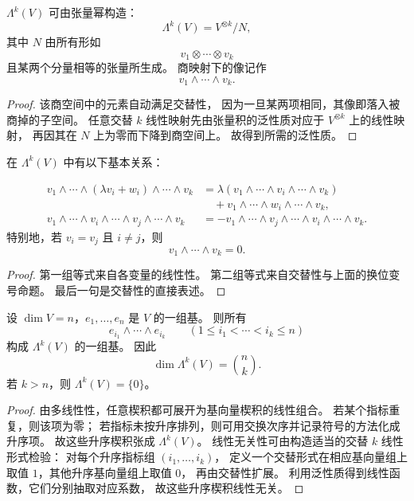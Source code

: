 \begin{theorem} $\Lambda^k(V)$ 可由张量幂构造： \[ \Lambda^k(V)=V^{\otimes k}/N, \] 其中 $N$ 由所有形如 \[ v_1\otimes\cdots\otimes v_k \] 且某两个分量相等的张量所生成。 商映射下的像记作 \[ v_1\wedge\cdots\wedge v_k. \] \end{theorem}




\begin{proof} 该商空间中的元素自动满足交替性， 因为一旦某两项相同，其像即落入被商掉的子空间。 任意交替 $k$ 线性映射先由张量积的泛性质对应于 $V^{\otimes k}$ 上的线性映射， 再因其在 $N$ 上为零而下降到商空间上。 故得到所需的泛性质。 \end{proof}




\begin{proposition} 在 $\Lambda^k(V)$ 中有以下基本关系：




\begin{align*} v_1\wedge\cdots\wedge(\lambda v_i+w_i)\wedge\cdots\wedge v_k &=\lambda(v_1\wedge\cdots\wedge v_i\wedge\cdots\wedge v_k)\\ &\quad +v_1\wedge\cdots\wedge w_i\wedge\cdots\wedge v_k,\\ v_1\wedge\cdots\wedge v_i\wedge\cdots\wedge v_j\wedge\cdots\wedge v_k &=-v_1\wedge\cdots\wedge v_j\wedge\cdots\wedge v_i\wedge\cdots\wedge v_k. \end{align*} 特别地，若 $v_i=v_j$ 且 $i\neq j$，则 \[ v_1\wedge\cdots\wedge v_k=0. \] \end{proposition}




\begin{proof} 第一组等式来自各变量的线性性。 第二组等式来自交替性与上面的换位变号命题。 最后一句是交替性的直接表述。 \end{proof}




\begin{theorem} 设 $\dim V=n$，$e_1,\dots,e_n$ 是 $V$ 的一组基。 则所有 \[ e_{i_1}\wedge\cdots\wedge e_{i_k} \qquad (1\leq i_1<\cdots<i_k\leq n) \] 构成 $\Lambda^k(V)$ 的一组基。 因此 \[ \dim\Lambda^k(V)=\binom{n}{k}. \] 若 $k>n$，则 $\Lambda^k(V)=\{0\}$。 \end{theorem}




\begin{proof} 由多线性性，任意楔积都可展开为基向量楔积的线性组合。 若某个指标重复，则该项为零； 若指标未按升序排列，则可用交换次序并记录符号的方法化成升序项。 故这些升序楔积张成 $\Lambda^k(V)$。 线性无关性可由构造适当的交替 $k$ 线性形式检验： 对每个升序指标组 $(i_1,\dots,i_k)$， 定义一个交替形式在相应基向量组上取值 $1$，其他升序基向量组上取值 $0$， 再由交替性扩展。 利用泛性质得到线性函数，它们分别抽取对应系数， 故这些升序楔积线性无关。 \end{proof}




